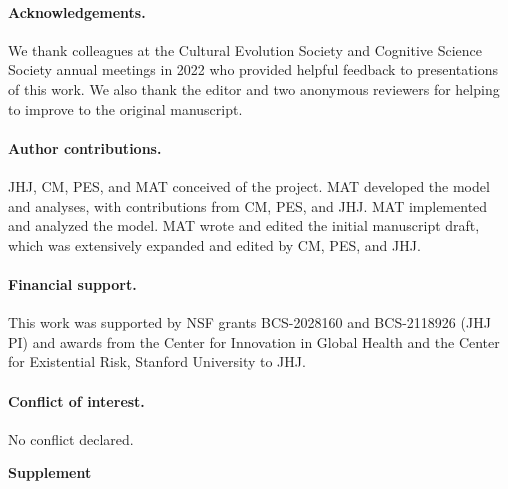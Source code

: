 \documentclass[letterpaper,11.5pt]{scrartcl}
\newcommand{\mt}[1]{{\textcolor{myorange} {({\tiny MT:} #1)}}}
\newcommand{\cm}[1]{{\textcolor{mypurple} {({\tiny CM:} #1)}}}
\begin{document}
\paragraph{Acknowledgements.} We thank colleagues at the Cultural Evolution
Society and Cognitive Science Society annual meetings in 2022 who provided helpful feedback
to presentations of this work. We also thank the editor and two anonymous reviewers
for helping to improve to the original manuscript.%
% 

\paragraph{Author contributions.} JHJ, CM, PES, and MAT conceived of the project. MAT developed the model
and analyses, with contributions from CM, PES, and JHJ. MAT implemented and analyzed the model. MAT wrote and edited the initial manuscript draft, which was extensively expanded and edited by CM, PES, and JHJ.

\paragraph{Financial support.} This work was supported by NSF grants BCS-2028160 and BCS-2118926 (JHJ PI) and awards from the Center for Innovation in Global Health and the Center for Existential Risk, Stanford University to JHJ.

\paragraph{Conflict of interest.} No conflict declared. \\[1em]




\pagebreak
\begin{center}
  \textbf{\Large \textsf{Supplement}}
\end{center}
\setcounter{equation}{1}
\setcounter{figure}{0}
\setcounter{section}{0}
\setcounter{table}{0}
\setcounter{page}{1}
\makeatletter
\renewcommand{\theequation}{S\arabic{equation}}
\renewcommand{\thefigure}{S\arabic{figure}}
\renewcommand{\thetable}{S\arabic{table}}
\renewcommand{\thesection}{S\arabic{section}}
\renewcommand{\thepage}{S\arabic{page}}
\end{document}
